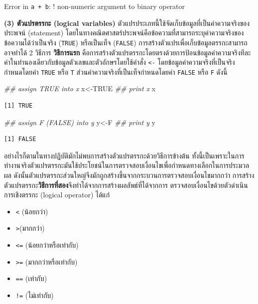 \documentclass[
  a4paper,
]{book}
\newenvironment{Shaded}{\begin{snugshade}}{\end{snugshade}}
\newcommand{\ConstantTok}[1]{\textcolor[rgb]{0.56,0.35,0.01}{#1}}
\newcommand{\DocumentationTok}[1]{\textcolor[rgb]{0.37,0.37,0.37}{\textit{#1}}}
\newcommand{\NormalTok}[1]{\textcolor[rgb]{0.00,0.23,0.31}{#1}}
\newcommand{\OtherTok}[1]{\textcolor[rgb]{0.00,0.23,0.31}{#1}}
\begin{document}
Error in \texttt{a\ +\ b}: ! non-numeric argument to binary operator

\textbf{(3) ตัวแปรตรรกะ (logical variables)}
ตัวแปรประเภทนี้ใช้จัดเก็บข้อมูลที่เป็นค่าความจริงของ ประพจน์ (statement)
โดยในทางคณิตศาสตร์ประพจน์คือข้อความที่สามารถระบุค่าความจริงของ ข้อความได้ว่าเป็นจริง
(\texttt{TRUE}) หรือเป็นเท็จ (\texttt{FALSE})
การสร้างตัวแปรเพื่อเก็บข้อมูลตรรกะสามารถ อาจทำได้ 2 วิธีการ \textbf{วิธีการแรก}
คือการสร้างตัวแปรตรรกะโดยตรงด้วยการป้อนข้อมูลค่าความจริงทีละค่าในทำนองเดียวกับข้อมูลตัวเลขและตัวอักษรโดยใช้คำสั่ง
\texttt{\textless{}-} โดยข้อมูลค่าความจริงที่เป็นจริง กำหนดโดยค่า \texttt{TRUE}
หรือ \texttt{T} ส่วนค่าความจริงที่เป็นเท็จกำหนดโดยค่า \texttt{FALSE} หรือ
\texttt{F} ดังนี้

\begin{Shaded}
\begin{Highlighting}[]
\DocumentationTok{\#\# assign TRUE into x}
\NormalTok{x}\OtherTok{\textless{}{-}}\ConstantTok{TRUE}
\DocumentationTok{\#\# print x}
\NormalTok{x}
\end{Highlighting}
\end{Shaded}

\begin{verbatim}
[1] TRUE
\end{verbatim}

\begin{Shaded}
\begin{Highlighting}[]
\DocumentationTok{\#\# assign F (FALSE) into y}
\NormalTok{y}\OtherTok{\textless{}{-}}\NormalTok{F}
\DocumentationTok{\#\# print y}
\NormalTok{y}
\end{Highlighting}
\end{Shaded}

\begin{verbatim}
[1] FALSE
\end{verbatim}

อย่างไรก็ตามในทางปฏิบัติมักไม่พบการสร้างตัวแปรตรรกะด้วยวิธีการข้างต้น
ทั้งนี้เป็นเพราะในการทำงานจริงตัวแปรตรรกะมันใช้ประโยชน์ในการตรวจสอบเงื่อนไขเพื่อกำหนดทางเลือกในการประมวลผล
ดังนั้นตัวแปรตรรกะส่วนใหญ่จึงมักถูกสร้างขึ้นจากกระบวนการตรวจสอบเงื่อนไขมากกว่า
การสร้างตัวแปรตรรกะ\textbf{วิธีการที่สอง}จึงทำได้จากการสร้างผลลัพธ์ที่ได้จากการ
ตรวจสอบเงื่อนไขด้วยตัวดำเนินการเชิงตรรกะ (logical operator) ได้แก่

\begin{itemize}
\item
  \texttt{\textless{}} (น้อยกว่า)
\item
  \texttt{\textgreater{}}(มากกว่า)
\item
  \texttt{\textless{}=} (น้อยกว่าหรือเท่ากับ)
\item
  \texttt{\textgreater{}=} (มากกว่าหรือเท่ากับ)
\item
  \texttt{==} (เท่ากับ)
\item
  \texttt{!=} (ไม่เท่ากับ)
\end{itemize}
\end{document}
